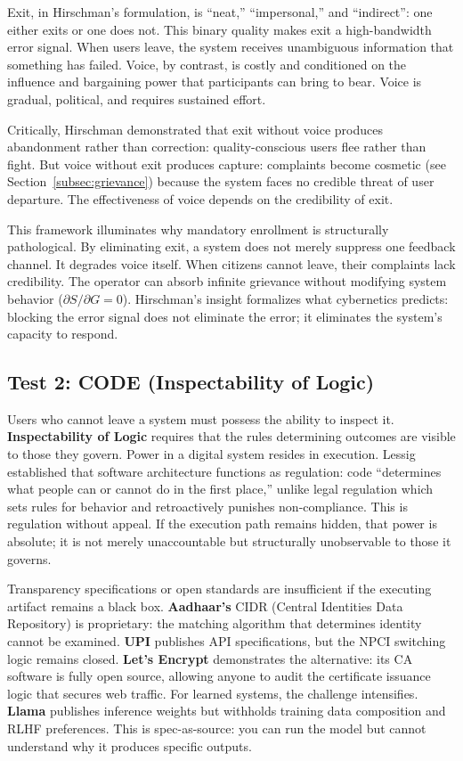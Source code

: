 Exit, in Hirschman's formulation, is ``neat,'' ``impersonal,'' and ``indirect'': one either exits or one does not. This binary quality makes exit a high-bandwidth error signal. When users leave, the system receives unambiguous information that something has failed. Voice, by contrast, is costly and conditioned on the influence and bargaining power that participants can bring to bear. Voice is gradual, political, and requires sustained effort.

Critically, Hirschman demonstrated that exit without voice produces abandonment rather than correction: quality-conscious users flee rather than fight. But voice without exit produces capture: complaints become cosmetic (see Section~\ref{subsec:grievance}) because the system faces no credible threat of user departure. The effectiveness of voice depends on the credibility of exit.

This framework illuminates why mandatory enrollment is structurally pathological. By eliminating exit, a system does not merely suppress one feedback channel. It degrades voice itself. When citizens cannot leave, their complaints lack credibility. The operator can absorb infinite grievance without modifying system behavior ($\partial S / \partial G = 0$). Hirschman's insight formalizes what cybernetics predicts: blocking the error signal does not eliminate the error; it eliminates the system's capacity to respond.

\subsection{Test 2: CODE (Inspectability of Logic)}

Users who cannot leave a system must possess the ability to inspect it. \textbf{Inspectability of Logic} requires that the rules determining outcomes are visible to those they govern. Power in a digital system resides in execution. Lessig \citep{lessig2006} established that software architecture functions as regulation: code ``determines what people can or cannot do in the first place,'' unlike legal regulation which sets rules for behavior and retroactively punishes non-compliance. This is regulation without appeal. If the execution path remains hidden, that power is absolute; it is not merely unaccountable but structurally unobservable to those it governs.

Transparency specifications or open standards are insufficient if the executing artifact remains a black box. \textbf{Aadhaar's} CIDR (Central Identities Data Repository) is proprietary: the matching algorithm that determines identity cannot be examined. \textbf{UPI} publishes API specifications, but the NPCI switching logic remains closed. \textbf{Let's Encrypt} demonstrates the alternative: its CA software is fully open source, allowing anyone to audit the certificate issuance logic that secures web traffic. For learned systems, the challenge intensifies. \textbf{Llama} publishes inference weights but withholds training data composition and RLHF preferences. This is spec-as-source: you can run the model but cannot understand why it produces specific outputs.

